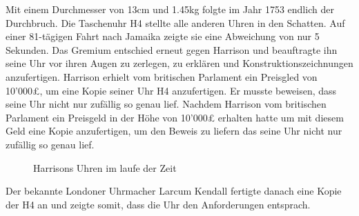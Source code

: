 \begin{refsection}
Mit einem Durchmesser von 13cm und 1.45kg folgte im Jahr 1753 endlich der Durchbruch.
Die Taschenuhr H4 stellte alle anderen Uhren in den Schatten. Auf einer 81-tägigen Fahrt nach Jamaika zeigte sie eine Abweichung von nur 5 Sekunden.
Das Gremium entschied erneut gegen Harrison und beauftragte ihn seine Uhr vor ihren Augen zu zerlegen, zu erklären und Konstruktionszeichnungen anzufertigen.
Harrison erhielt vom britischen Parlament ein Preisgled von 10’000£, um eine Kopie seiner Uhr H4 anzufertigen. Er musste beweisen, dass seine Uhr nicht nur zufällig so genau lief.
Nachdem Harrison vom britischen Parlament ein Preisgeld in der Höhe von 10’000£ erhalten hatte um mit diesem Geld eine Kopie anzufertigen, um den Beweis zu liefern das seine Uhr nicht nur zufällig so genau lief.
\begin{figure}[!htb]
\centering
\quad \quad
\centering
\quad \quad
\centering
\caption{Harrisons Uhren im laufe der Zeit} 
\end{figure}
Der bekannte Londoner Uhrmacher Larcum Kendall fertigte danach eine Kopie der H4 an und zeigte somit, dass die Uhr den Anforderungen entsprach.


\end{refsection}
